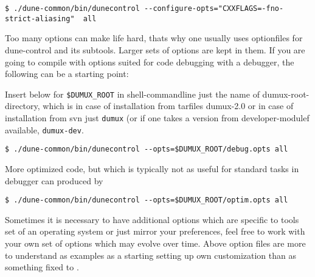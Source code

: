 \begin{lstlisting}[style=Bash]
$ ./dune-common/bin/dunecontrol --configure-opts="CXXFLAGS=-fno-strict-aliasing"  all
\end{lstlisting}

Too many options  can make life hard, thats why one usually uses optionfiles for dune-control and its subtools.
Larger sets of options are kept in them. 
If you are going to compile with options suited for code debugging with a debugger, the following
can be a starting point:

Insert below for \verb+$DUMUX_ROOT+ in shell-commandline just the name of dumux-root-directory, which is in case of installation from tarfiles dumux-2.0 or in case of installation from svn just \texttt{dumux} (or if one takes a version from developer-modulef available, \texttt{dumux-dev}.

\begin{lstlisting}[style=Bash]
$ ./dune-common/bin/dunecontrol --opts=$DUMUX_ROOT/debug.opts all
\end{lstlisting}

More optimized code, but which is typically not as useful for standard tasks in debugger can produced by 

\begin{lstlisting}[style=Bash]
$ ./dune-common/bin/dunecontrol --opts=$DUMUX_ROOT/optim.opts all
\end{lstlisting}

Sometimes it is necessary to have additional options which are specific to tools set of an operating system or just mirror your preferences, feel free to work with your own set of options which may evolve over time. Above option files are more to understand as examples as a starting setting up own customization than as something fixed to \Dumux.

